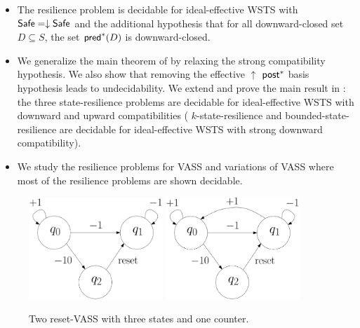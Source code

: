 \begin{itemize}
\item The resilience problem is decidable for ideal-effective WSTS with 
$\textsf{Safe}=\downarrow \textsf{Safe}$
and
the additional hypothesis that
for all downward-closed set $D \subseteq S$, the set $\textsf{pred}^*(D)$ is downward-closed.
%

\item We generalize the main theorem of \cite{DBLP:journals/corr/abs-2108-00889,DBLP:conf/gg/Ozkan22} by relaxing the strong compatibility hypothesis.
We also show that removing the effective 
$\uparrow$ $\textsf{post}^*$ basis hypothesis leads to undecidability. We extend and prove the main result in  \cite{DBLP:journals/corr/PrasadZ16} : the three state-resilience problems are decidable for ideal-effective WSTS with downward and upward compatibilities ({ $k$-state-resilience} and { bounded-state-resilience} are decidable for ideal-effective WSTS with strong downward compatibility).
%

\item We study the resilience problems for VASS and variations of VASS where most of the resilience problems are shown decidable.
\end{itemize}


 \begin{center}
	\begin{figure}
\includegraphics[width=0.45\textwidth]{FigureC}
\hspace{0.5cm}
\includegraphics[width=0.45\textwidth]{FigureD}
	\caption{Two reset-VASS with three states and one counter.}
					\label{r-V}
	\end{figure}
\end{center}

